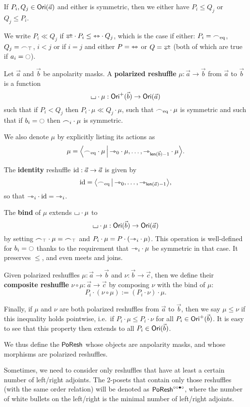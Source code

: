 \documentclass[a4paper]{memoir}
\begin{document}
\begin{definition}
	If $P_i, Q_j \in {\mathsf{Ori}}(\vec a)$ and either is symmetric, then we either have $P_i \leq Q_j$ or $Q_j \leq P_i$.
	
	We write $P_i \ll Q_j$ if $\infrajetsym \cdot P_i \leq \equijetsym \cdot Q_j$, which is the case if either: $P_i = {\frown}_{{\mathrm{eq}}}$, $Q_j = {\frown}_\top$, $i < j$ or if $i = j$ and either $P = {\leftrightarrowtriangle}$ or $Q = \infrajetsym$ (both of which are true if $a_i = \npolar$).
\end{definition}
\begin{definition}\label{def:poreshcat}
	Let $\vec a$ and $\vec b$ be anpolarity masks.
	A \textbf{polarized reshuffle} $\mu : \vec a \to \vec b$ from $\vec a$ to $\vec b$ is a function
	\[
		{\llcorner\hspace{-.4ex}\lrcorner} \cdot \mu : {\mathsf{Ori}}^+(\vec b) \to {\mathsf{Ori}}(\vec a)
	\]
	such that if $P_i < Q_j$ then $P_i \cdot \mu \ll Q_j \cdot \mu$, such that ${\frown}_{{\mathrm{eq}}} \cdot \mu$ is symmetric and such that if $b_i = \npolar$ then ${\frown}_i \cdot \mu$ is symmetric.
	
	We also denote $\mu$ by explicitly listing its actions as
	\[
		\mu = \mathopen{}\left\langle {\frown}_{{\mathrm{eq}}} \cdot \mu \,\middle|\, {\rightarrowtriangle}_0 \cdot \mu, \ldots, {\rightarrowtriangle}_{\mathsf{len}(\vec b)-1} \cdot \mu \right\rangle\mathclose{}.
	\]
	
	The \textbf{identity} reshuffle $\mathrm{id} : \vec a \to \vec a$ is given by
	\[
		\mathrm{id} = \mathopen{}\left\langle {\frown}_{{\mathrm{eq}}} \,\middle|\, {\rightarrowtriangle}_0, \ldots, {\rightarrowtriangle}_{\mathsf{len}(\vec a)-1} \right\rangle\mathclose{},
	\]
	so that ${\rightarrowtriangle}_i \cdot \mathrm{id} = {\rightarrowtriangle}_i$.
	
	The \textbf{bind} of $\mu$ extends ${\llcorner\hspace{-.4ex}\lrcorner} \cdot \mu$ to
	\[
		{\llcorner\hspace{-.4ex}\lrcorner} \cdot \mu : {\mathsf{Ori}}(\vec b) \to {\mathsf{Ori}}(\vec a)
	\]
	by setting ${\frown}_\top \cdot \mu = {\frown}_\top$ and $P_i \cdot \mu = P \cdot ({\rightarrowtriangle}_i \cdot \mu)$.
	This operation is well-defined for $b_i = \npolar$ thanks to the requirement that ${\rightarrowtriangle}_i \cdot \mu$ be symmetric in that case.
	It preserves $\leq$, and even meets and joins.
	
	Given polarized reshuffles $\mu : \vec a \to \vec b$ and $\nu : \vec b \to \vec c$, then we define their \textbf{composite reshuffle} $\nu \circ \mu : \vec a \to \vec c$ by composing $\nu$ with the bind of $\mu$:
	\[
		P_i \cdot (\nu \circ \mu) := (P_i \cdot \nu) \cdot \mu.
	\]
	
	Finally, if $\mu$ and $\nu$ are both polarized reshuffles from $\vec a$ to $\vec b$, then we say $\mu \leq \nu$ if this inequality holds pointwise, i.e.\ if $P_i \cdot \mu \leq P_i \cdot \nu$ for all $P_i \in {\mathsf{Ori}}^+(\vec b)$.
	It is easy to see that this property then extends to all $P_i \in {\mathsf{Ori}}(\vec b)$.
	
	We thus define the  $\mathsf{PoResh}$ whose objects are anpolarity masks, and whose morphisms are polarized reshuffles.
	
	Sometimes, we need to consider only reshuffles that have at least a certain number of left/right adjoints. The 2-posets that contain only those reshuffles (with the same order relation) will be denoted as $\mathsf{PoResh}^{\circ \circ \bullet \circ}$, where the number of white bullets on the left/right is the minimal number of left/right adjoints.
\end{definition}
\end{document}
